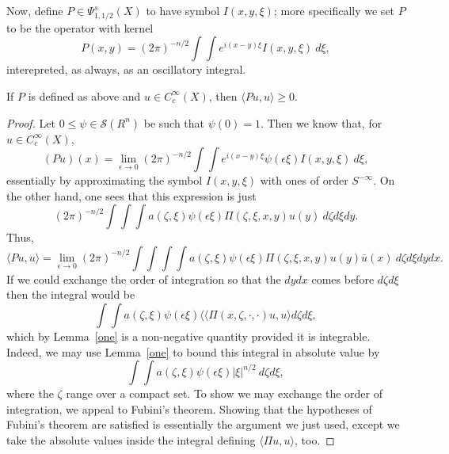 \documentclass[12pt]{article}
\begin{document}
Now, define $P \in \Psi^{s}_{1,1/2}(X)$ to have symbol $I(x,y,\xi)$; more specifically we set $P$ to be the operator with kernel
\[P(x,y) = (2\pi)^{-n/2}\int\int e^{i(x-y)\xi} I(x,y,\xi)\ d\xi,\]
interepreted, as always, as an oscillatory integral.

\begin{prop}If $P$ is defined as above and $u \in C_c^\infty(X)$, then $\langle Pu,u\rangle  \geq 0$.\end{prop}
\begin{proof}
Let $0 \leq \psi \in \mathcal S(R^n)$ be such that $\psi(0) = 1$. Then we know that, for $u \in C_c^\infty(X)$,
\[(Pu)(x) = \lim_{\epsilon \to 0} (2\pi)^{-n/2}\int\int e^{i(x-y)\xi}\psi(\epsilon\xi)I(x,y,\xi)\ d\xi,\]
essentially by approximating the symbol $I(x,y,\xi)$ with ones of order $S^{-\infty}$. On the other hand, one sees that this expression is just
\[(2\pi)^{-n/2}\int\int\int a(\zeta,\xi)\psi(\epsilon\xi)\Pi(\zeta,\xi,x,y)u(y)\ d\zeta d\xi dy.\]
Thus,
\[\langle Pu,u\rangle = \lim_{\epsilon \to 0} (2\pi)^{-n/2}\int\int\int \int a(\zeta,\xi)\psi(\epsilon\xi)\Pi(\zeta,\xi,x,y)u(y)\overline{u}(x)\ d\zeta d\xi dydx.\] If we could exchange the order of integration so that the $dydx$ comes before $d\zeta d\xi$ then the integral would be
\[\int \int a(\zeta,\xi)\psi(\epsilon\xi)\langle \langle\Pi(x,\zeta,\cdot,\cdot)u,u\rangle d\zeta d\xi,\]
which by Lemma~\ref{one} is a non-negative quantity provided it is integrable. Indeed, we may use Lemma~\ref{one} to bound this integral in absolute value by
\[\int\int a(\zeta,\xi)\psi(\epsilon\xi)|\xi|^{n/2}\ d\zeta d\xi,\]
where the $\zeta$ range over a compact set. To show we may exchange the order of integration, we appeal to Fubini's theorem. Showing that the hypotheses of Fubini's theorem are satisfied is essentially the argument we just used, except we take the absolute values inside the integral defining $\langle \Pi u, u\rangle$, too.\end{proof}
\end{document}
